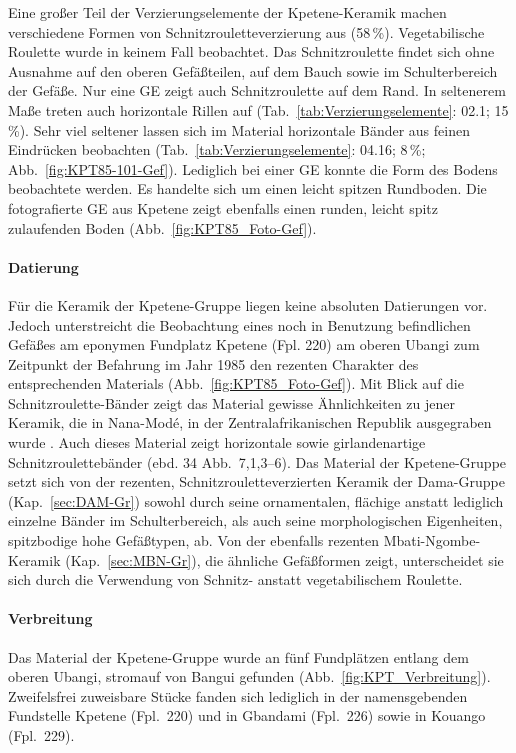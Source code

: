 Eine großer Teil der Verzierungselemente der Kpetene-Keramik machen verschiedene Formen von Schnitzrouletteverzierung aus (58\,\%). Vegetabilische Roulette wurde in keinem Fall beobachtet. Das Schnitzroulette findet sich ohne Ausnahme auf den oberen Gefäßteilen, auf dem Bauch sowie im Schulterbereich der Gefäße. Nur eine GE zeigt auch Schnitzroulette auf dem Rand. In seltenerem Maße treten auch horizontale Rillen auf (Tab.~\ref{tab:Verzierungselemente}: 02.1; 15\,\%). Sehr viel seltener lassen sich im Material horizontale Bänder aus feinen Eindrücken beobachten (Tab.~\ref{tab:Verzierungselemente}: 04.16; 8\,\%; Abb.~\ref{fig:KPT85-101-Gef}). Lediglich bei einer GE konnte die Form des Bodens beobachtete werden. Es handelte sich um einen leicht spitzen Rundboden. Die fotografierte GE aus Kpetene zeigt ebenfalls einen runden, leicht spitz zulaufenden Boden (Abb.~\ref{fig:KPT85_Foto-Gef}).

\paragraph{Datierung}
$\;$ \\
Für die Keramik der Kpetene-Gruppe liegen keine absoluten Datierungen vor. Jedoch unterstreicht die Beobachtung eines noch in Benutzung befindlichen Gefäßes am eponymen Fundplatz Kpetene (Fpl. 220) am oberen Ubangi zum Zeitpunkt der Befahrung im Jahr 1985 den rezenten Charakter des entsprechenden Materials (Abb.~\ref{fig:KPT85_Foto-Gef}). Mit Blick auf die Schnitzroulette-Bänder zeigt das Material gewisse Ähnlichkeiten zu jener Keramik, die in Nana-Modé, in der Zentralafrikanischen Republik ausgegraben wurde \parencite{David.1977}. Auch dieses Material zeigt horizontale sowie girlandenartige Schnitzroulettebänder (ebd. 34 Abb.~7,1,3--6). Das Material der Kpetene-Gruppe setzt sich von der rezenten, Schnitzrouletteverzierten Keramik der Dama-Gruppe (Kap.~\ref{sec:DAM-Gr}) sowohl durch seine ornamentalen, flächige anstatt lediglich einzelne Bänder im Schulterbereich, als auch seine morphologischen Eigenheiten, spitzbodige hohe  Gefäßtypen, ab. Von der ebenfalls rezenten Mbati-Ngombe-Keramik (Kap.~\ref{sec:MBN-Gr}), die ähnliche Gefäßformen zeigt, unterscheidet sie sich durch die Verwendung von Schnitz- anstatt vegetabilischem Roulette.

\paragraph{Verbreitung}
$\;$ \\
Das Material der Kpetene-Gruppe wurde an fünf Fundplätzen entlang dem oberen Ubangi, stromauf von Bangui gefunden (Abb.~\ref{fig:KPT_Verbreitung}). Zweifelsfrei zuweisbare Stücke fanden sich lediglich in der namensgebenden Fundstelle Kpetene (Fpl.~220) und in Gbandami (Fpl.~226) sowie in Kouango (Fpl.~229). 
